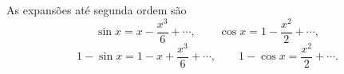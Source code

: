 As expansões até segunda ordem são
\[
\sin x = x - \frac{x^{3}}{6} + \cdots,
\qquad
\cos x = 1 - \frac{x^{2}}{2} + \cdots,
\]
\[
1-\sin x = 1 - x + \frac{x^{3}}{6} + \cdots,
\qquad
1-\cos x = \frac{x^{2}}{2} + \cdots.
\]